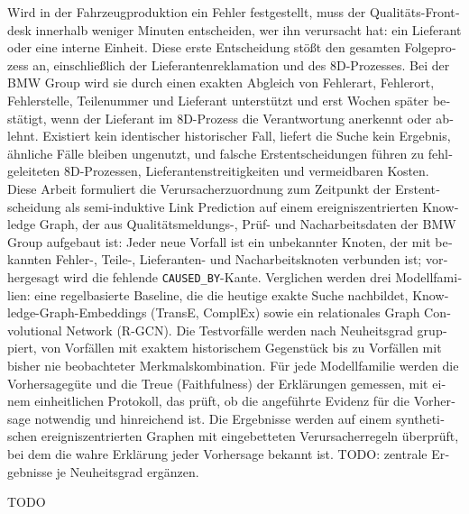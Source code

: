 \documentclass[
  12pt,
  a4paper,
  twoside=false,     %
  parskip,
  listof=totoc,      %
  bibliography=totoc %
]{scrbook}
\begin{document}
\begin{otherlanguage}{ngerman}
Wird in der Fahrzeugproduktion ein Fehler festgestellt, muss der
Qualitäts-Frontdesk innerhalb weniger Minuten entscheiden, wer ihn
verursacht hat: ein Lieferant oder eine interne Einheit. Diese erste
Entscheidung stößt den gesamten Folgeprozess an, einschließlich der
Lieferantenreklamation und des 8D-Prozesses. Bei der BMW Group wird sie durch
einen exakten Abgleich von Fehlerart, Fehlerort, Fehlerstelle, Teilenummer und
Lieferant unterstützt und erst Wochen später bestätigt, wenn der
Lieferant im 8D-Prozess die Verantwortung anerkennt oder ablehnt. Existiert
kein identischer historischer Fall, liefert die Suche kein Ergebnis,
ähnliche Fälle bleiben ungenutzt, und falsche Erstentscheidungen führen
zu fehlgeleiteten 8D-Prozessen, Lieferantenstreitigkeiten und vermeidbaren
Kosten.
Diese Arbeit formuliert die Verursacherzuordnung zum Zeitpunkt der
Erstentscheidung als semi-induktive Link Prediction auf einem
ereigniszentrierten Knowledge Graph, der aus Qualitätsmeldungs-, Prüf- und
Nacharbeitsdaten der BMW Group aufgebaut ist: Jeder neue Vorfall ist ein
unbekannter Knoten, der mit bekannten Fehler-, Teile-, Lieferanten- und
Nacharbeitsknoten verbunden ist; vorhergesagt wird die fehlende
\texttt{CAUSED\_BY}-Kante. Verglichen werden drei Modellfamilien: eine
regelbasierte Baseline, die die heutige exakte Suche nachbildet,
Knowledge-Graph-Embeddings (TransE, ComplEx) sowie ein relationales Graph
Convolutional Network (R-GCN). Die Testvorfälle werden nach Neuheitsgrad
gruppiert, von Vorfällen mit exaktem historischem Gegenstück bis zu
Vorfällen mit bisher nie beobachteter Merkmalskombination. Für jede
Modellfamilie werden die Vorhersagegüte und die Treue (Faithfulness) der
Erklärungen gemessen, mit einem einheitlichen Protokoll, das prüft, ob die
angeführte Evidenz für die Vorhersage notwendig und hinreichend ist.
Die Ergebnisse werden auf einem synthetischen ereigniszentrierten Graphen mit
eingebetteten Verursacherregeln überprüft, bei dem die wahre Erklärung
jeder Vorhersage bekannt ist.
TODO: zentrale Ergebnisse je Neuheitsgrad ergänzen.
\end{otherlanguage}

TODO
\end{document}
